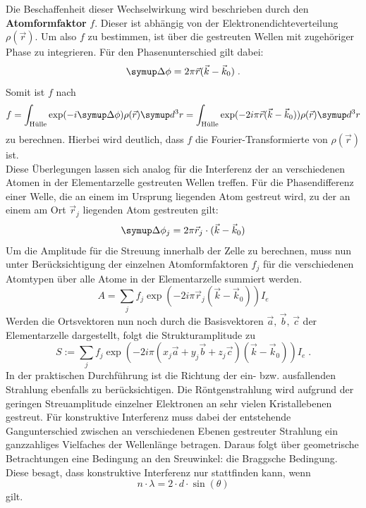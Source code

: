 Die Beschaffenheit dieser Wechselwirkung wird beschrieben durch den \textbf{Atomformfaktor} $f$. Dieser ist abhängig von
der Elektronendichteverteilung $\rho(\vec{r})$. Um also $f$ zu bestimmen, ist über die gestreuten Wellen mit zugehöriger
Phase zu integrieren. Für den Phasenunterschied gilt dabei:
%
\begin{equation}
  \upD\phi=2\pi\vec{r}(\vec{k}-\vec{k}_0) \; .
\end{equation}
%
Somit ist $f$ nach
%
\begin{equation}
  f=\int_\text{Hülle}\exp(-i\upD\phi)\rho(\vec{r})\upd^3r=\int_\text{Hülle}\exp(-2i\pi\vec{r}(\vec{k}-\vec{k}_0))\rho(\vec{r})\upd^3r
\end{equation}
%
zu berechnen. Hierbei wird deutlich, dass $f$ die Fourier-Transformierte von $\rho(\vec{r})$ ist.\\
Diese Überlegungen lassen sich analog für die Interferenz der an verschiedenen Atomen in der Elementarzelle gestreuten Wellen treffen.
Für die Phasendifferenz einer Welle, die an einem im Ursprung liegenden Atom gestreut wird, zu der an einem am Ort $\vec{r}_j$
liegenden Atom gestreuten gilt:
%
\begin{equation}
  \upD\phi_j=2\pi\vec{r}_j\cdot(\vec{k}-\vec{k}_0)
\end{equation}
%
Um die Amplitude für die Streuung innerhalb der Zelle zu berechnen, muss nun unter Berücksichtigung der einzelnen Atomformfaktoren
$f_j$ für die verschiedenen Atomtypen über alle Atome in der Elementarzelle summiert werden.
%
\begin{equation}
  A=\sum_jf_j\exp(-2i\pi\vec{r}_j(\vec{k}-\vec{k}_0))I_e
\end{equation}
%
Werden die Ortsvektoren nun noch durch die Basisvektoren $\vec{a},\,\vec{b},\,\vec{c}$ der Elementarzelle dargestellt, folgt
die Strukturamplitude zu
%
\begin{equation}
  S:=\sum_jf_j\exp(-2i\pi(x_j\vec{a}+y_j\vec{b}+z_j\vec{c})(\vec{k}-\vec{k}_0))I_e \; .
  \label{eq:strukturamplitude}
\end{equation}
%
In der praktischen Durchführung ist die Richtung der ein- bzw. ausfallenden Strahlung ebenfalls zu berücksichtigen. Die Röntgenstrahlung wird aufgrund
der geringen Streuamplitude einzelner Elektronen an sehr vielen Kristallebenen gestreut. Für konstruktive Interferenz muss dabei der
entstehende Gangunterschied zwischen an verschiedenen Ebenen gestreuter Strahlung ein ganzzahliges Vielfaches der Wellenlänge betragen.
Daraus folgt über geometrische Betrachtungen eine Bedingung an den Sreuwinkel: die Braggsche Bedingung. Diese besagt, dass konstruktive
Interferenz nur stattfinden kann, wenn
%
\begin{equation}
  n\cdot\lambda=2\cdot d\cdot\sin(\theta)
  \label{eq:bragg}
\end{equation}
%
gilt.
%
